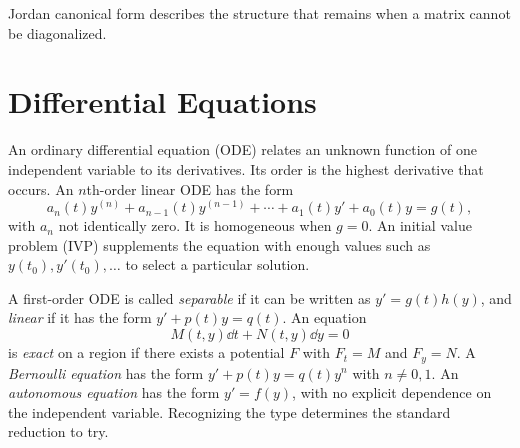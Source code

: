     \begin{remark}
        Jordan canonical form describes the structure that remains when a matrix
        cannot be diagonalized.
    \end{remark}

    \chapter{Differential Equations}



    \begin{definition}
        An ordinary differential equation (ODE) relates an unknown function of
        one independent variable to its derivatives. Its order is the highest
        derivative that occurs. An $n$th-order linear ODE has the form
        \[
            a_n(t)y^{(n)}+a_{n-1}(t)y^{(n-1)}+\cdots+a_1(t)y'+a_0(t)y=g(t),
        \]
        with $a_n$ not identically zero. It is homogeneous when $g=0$.
        An initial value problem (IVP) supplements the equation with enough
        values such as $y(t_0),y'(t_0),\dots$ to select a particular solution.
    \end{definition}

    \begin{definition}
        A first-order ODE is called \emph{separable} if it can be written as
        $y'=g(t)h(y)$, and \emph{linear} if it has the form
        $y'+p(t)y=q(t)$. An equation
        \[
            M(t,y)\dd t+N(t,y)\dd y=0
        \]
        is \emph{exact} on a region if there exists a potential $F$ with
        $F_t=M$ and $F_y=N$. A \emph{Bernoulli equation} has the form
        $y'+p(t)y=q(t)y^n$ with $n\neq0,1$. An \emph{autonomous equation}
        has the form $y'=f(y)$, with no explicit dependence on the independent
        variable. Recognizing the type determines the standard reduction to try.
    \end{definition}

